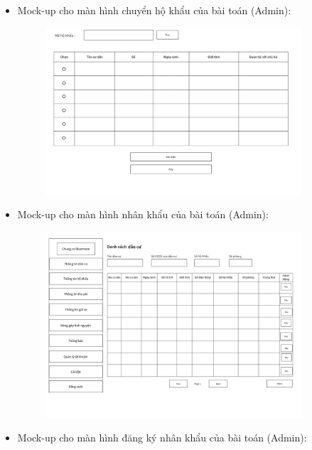 \documentclass{article}
\begin{document}
\begin{itemize}
\begin{figure}[H]
    \end{figure}
    \item Mock-up cho màn hình chuyển hộ khẩu của bài toán (Admin):
    \begin{figure}[H]
        \centering
        \includegraphics[width=0.9\textwidth]{Ảnh chương 4/Màn hình chuyển hộ khẩu.png}
    \end{figure}
    \vspace{3cm}
    \item Mock-up cho màn hình nhân khẩu của bài toán (Admin):
    \begin{figure}[H]
        \centering
        \includegraphics[width=0.9\textwidth]{Ảnh chương 4/Màn hình dân cư.png}
    \end{figure}
    \vspace{2cm}
    \item Mock-up cho màn hình đăng ký nhân khẩu của bài toán (Admin):
    \begin{figure}[H]
        \centering

\end{figure}
\end{itemize}
\end{document}
